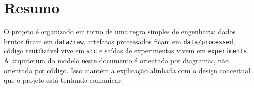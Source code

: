 \documentclass[11pt]{article}
\newcommand{\pathtt}[1]{\texttt{#1}}
\begin{document}
\section{Resumo}

O projeto é organizado em torno de uma regra simples de engenharia: dados brutos ficam em \pathtt{data/raw}, artefatos processados ficam em \pathtt{data/processed}, código reutilizável vive em \pathtt{src} e saídas de experimentos vivem em \pathtt{experiments}. A arquitetura do modelo neste documento é orientada por diagramas, não orientada por código. Isso mantém a explicação alinhada com o design conceitual que o projeto está tentando comunicar.
\end{document}
